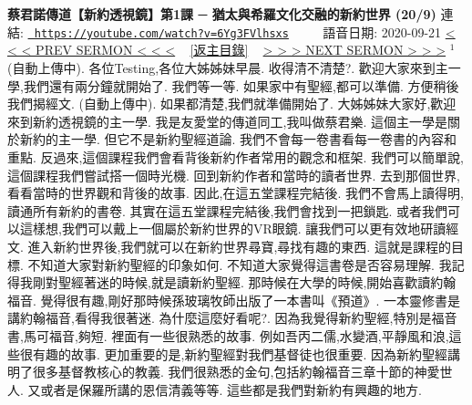 \documentclass{book}
\begin{document}
\section{}
\label{sec:6Yg3FVlhsxs}
\textbf{蔡君諾傳道【新約透視鏡】第1課 ─ 猶太與希羅文化交融的新約世界 (20/9)}
\newline
\newline
連結: \href{https://youtube.com/watch?v=6Yg3FVlhsxs}{\texttt{ https://youtube.com/watch?v=6Yg3FVlhsxs}} ~~~~ 語音日期: 2020-09-21 
\newline
\newline
\hyperref[sec:UH_c8ivdgzM]{\small{< < < PREV SERMON < < <}}
~
\hyperref[sec:index]{\small{[返主目錄]}}
~
\hyperref[sec:meOlDsCMdvQ]{\small{> > > NEXT SERMON > > >}}
\newline
\newline
$^{1}$(自動上傳中).
各位Testing,各位大姊姊妹早晨.
收得清不清楚?.
歡迎大家來到主一學,我們還有兩分鐘就開始了.
我們等一等.
如果家中有聖經,都可以準備.
方便稍後我們揭經文.
(自動上傳中).
如果都清楚,我們就準備開始了.
大姊姊妹大家好,歡迎來到新約透視鏡的主一學.
我是友愛堂的傳道同工,我叫做蔡君樂.
這個主一學是關於新約的主一學.
但它不是新約聖經道論.
我們不會每一卷書看每一卷書的內容和重點.
反過來,這個課程我們會看背後新約作者常用的觀念和框架.
我們可以簡單說,這個課程我們嘗試搭一個時光機.
回到新約作者和當時的讀者世界.
去到那個世界,看看當時的世界觀和背後的故事.
因此,在這五堂課程完結後.
我們不會馬上讀得明,讀通所有新約的書卷.
其實在這五堂課程完結後,我們會找到一把鎖匙.
或者我們可以這樣想,我們可以戴上一個屬於新約世界的VR眼鏡.
讓我們可以更有效地研讀經文.
進入新約世界後,我們就可以在新約世界尋寶,尋找有趣的東西.
這就是課程的目標.
不知道大家對新約聖經的印象如何.
不知道大家覺得這書卷是否容易理解.
我記得我剛對聖經著迷的時候,就是讀新約聖經.
那時候在大學的時候,開始喜歡讀約翰福音.
覺得很有趣,剛好那時候孫玻璃牧師出版了一本書叫《預道》.
一本靈修書是講約翰福音,看得我很著迷.
為什麼這麼好看呢?.
因為我覺得新約聖經,特別是福音書,馬可福音,夠短.
裡面有一些很熟悉的故事.
例如吾丙二儒,水變酒,平靜風和浪,這些很有趣的故事.
更加重要的是,新約聖經對我們基督徒也很重要.
因為新約聖經講明了很多基督教核心的教義.
我們很熟悉的金句,包括約翰福音三章十節的神愛世人.
又或者是保羅所講的恩信清義等等.
這些都是我們對新約有興趣的地方.
\end{document}
